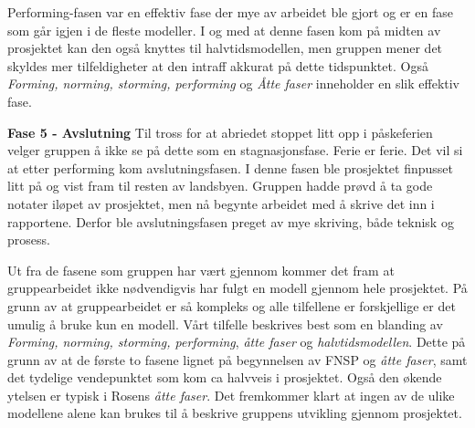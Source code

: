 \begin{adjustwidth}{2.5cm}{0cm}
Performing-fasen var en effektiv fase der mye av arbeidet ble gjort og er en fase som går igjen i de fleste modeller. 
I og med at denne fasen kom på midten av prosjektet kan den også knyttes til halvtidsmodellen, men gruppen mener det skyldes mer tilfeldigheter at den intraff akkurat på dette tidspunktet. 
Også \textit{Forming, norming, storming, performing} og \textit{Åtte faser} inneholder en slik effektiv fase. 
\vspace{\secspace}

\noindent \textbf{\Large Fase 5 - Avslutning}
Til tross for at abriedet stoppet litt opp i påskeferien velger gruppen å ikke se på dette som en stagnasjonsfase. Ferie er ferie. 
Det vil si at etter performing kom avslutningsfasen. 
I denne fasen ble prosjektet finpusset litt på og vist fram til resten av landsbyen. 
Gruppen hadde prøvd å ta gode notater iløpet av prosjektet, men nå begynte arbeidet med å skrive det inn i rapportene. 
Derfor ble avslutningsfasen preget av mye skriving, både teknisk og prosess. 
\vspace{\secspace}
\end{adjustwidth}

\vspace{\secspace}
Ut fra de fasene som gruppen har vært gjennom kommer det fram at gruppearbeidet ikke nødvendigvis har fulgt en modell gjennom hele prosjektet. 
På grunn av at gruppearbeidet er så kompleks og alle tilfellene er forskjellige er det umulig å bruke kun en modell\citep{levin}.
Vårt tilfelle beskrives best som en blanding av \textit{Forming, norming, storming, performing}, \textit{åtte faser} og \textit{halvtidsmodellen}. 
Dette på grunn av at de første to fasene lignet på begynnelsen av FNSP og \textit{åtte faser}, samt det tydelige vendepunktet som kom ca halvveis i prosjektet. 
Også den økende ytelsen er typisk i Rosens \textit{åtte faser}. 
Det fremkommer klart at ingen av de ulike modellene alene kan brukes til å beskrive gruppens utvikling gjennom prosjektet. 
